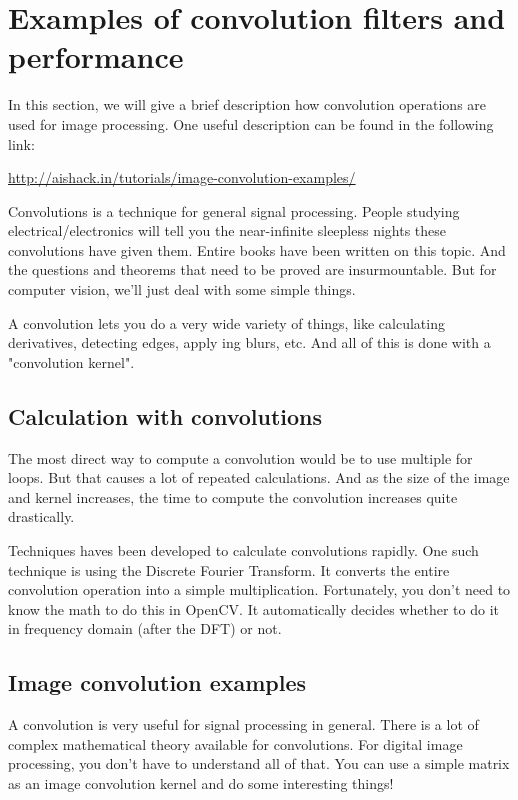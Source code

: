 \section{Examples of convolution filters and performance}
In this section, we will give a brief description how convolution operations are used for image processing.
One useful description can be found in the following link:

\href{http://aishack.in/tutorials/image-convolution-examples/}{http://aishack.in/tutorials/image-convolution-examples/}

Convolutions is a technique for general signal processing. People studying electrical/electronics will tell you the near-infinite sleepless nights these convolutions have given them. Entire books have been written on this topic. And the questions and theorems that need to be proved are insurmountable. But for computer vision, we'll just deal with some simple things.

A convolution lets you do a very wide variety of things, like calculating derivatives, detecting edges, apply ing blurs, etc. And all of this is done with a "convolution kernel".

\subsection{Calculation with convolutions}
The most direct way to compute a convolution would be to use multiple for loops. But that causes a lot of repeated calculations. And as the size of the image and kernel increases, the time to compute the convolution increases quite drastically.

Techniques haves been developed to calculate convolutions rapidly. One such technique is using the Discrete Fourier Transform. It converts the entire convolution operation into a simple multiplication. Fortunately, you don't need to know the math to do this in OpenCV. It automatically decides whether to do it in frequency domain (after the DFT) or not.

\subsection{Image convolution examples}
A convolution is very useful for signal processing in general. There is a lot of complex mathematical theory available for convolutions. For digital image processing, you don't have to understand all of that. You can use a simple matrix as an image convolution kernel and do some interesting things!


